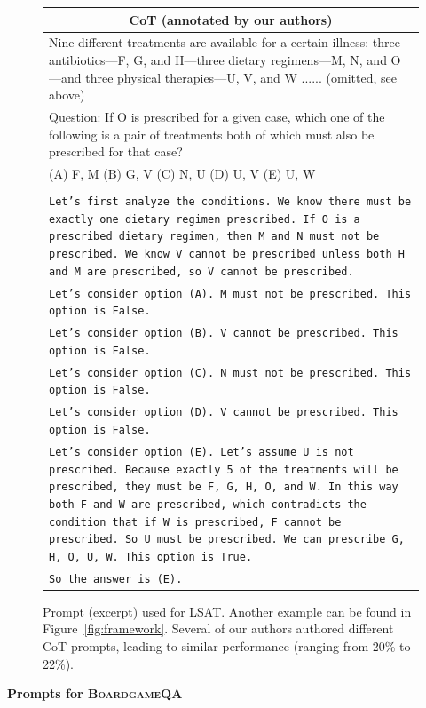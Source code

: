 \documentclass{article}
\theoremstyle{definition}
\newcommand{\lsat}{\textsc{LSAT}}
\newcommand{\boardgame}{\textsc{BoardgameQA}}
\begin{document}
\begin{figure}[h]
\begin{tabularx}{\linewidth}{X}
    \midrule
       \multicolumn{1}{c}{ {\sc \textbf{CoT}} (annotated by our authors) }   \\
       \midrule
 Nine different treatments are available for a certain illness: three antibiotics—F, G, and H—three dietary regimens—M, N, and O—and three physical therapies—U, V, and W ...... (omitted, see above) \\
Question: If O is prescribed for a given case, which one of the following is a pair of treatments both of which must also be prescribed for that case?\\
(A) F, M (B) G, V (C) N, U (D) U, V (E) U, W \\
\\
\tt Let's first analyze the conditions. We know there must be exactly one dietary regimen prescribed. If O is a prescribed dietary regimen, then M and N must not be prescribed. We know V cannot be prescribed unless both H and M are prescribed, so V cannot be prescribed.\\
\tt Let's consider option (A). M must not be prescribed. This option is False.\\
\tt Let's consider option (B). V cannot be prescribed. This option is False.\\
\tt Let's consider option (C). N must not be prescribed. This option is False.\\
\tt Let's consider option (D). V cannot be prescribed. This option is False.\\
\tt Let's consider option (E). Let's assume U is not prescribed. Because exactly 5 of the treatments will be prescribed, they must be F, G, H, O, and W. In this way both F and W are prescribed, which contradicts the condition that if W is prescribed, F cannot be prescribed. So U must be prescribed. We can prescribe G, H, O, U, W. This option is True.\\
\tt So the answer is (E).\\

\bottomrule
    \end{tabularx}
    \caption{Prompt (excerpt) used for \lsat{}. Another example can be found in Figure~\ref{fig:framework}. Several of our authors authored different CoT prompts, leading to similar performance (ranging from 20\% to 22\%). }
\end{figure}

\newpage
\textbf{Prompts for \boardgame{}}
\end{document}
